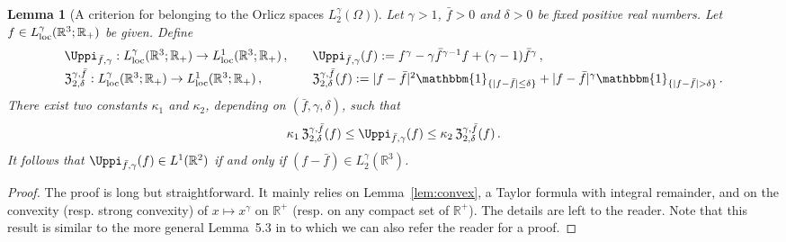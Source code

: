 \documentclass[11pt,reqno]{amsart}
\newtheorem{lemma}{Lemma}
\def \R{{\mathbb{R}}}
\begin{document}
\begin{lemma}[A criterion for  belonging to the Orlicz spaces $L_2^\gamma(\Omega)$]
  \label{lem:ORC}
  Let $\gamma >1$, $\bar f > 0$ and $\delta >0$ be fixed positive real numbers. Let $ f\in L_{\rm loc}^\gamma(\R^3;\R_+)$ be given. Define
  \[\begin{array}{ll}
    \Uppi_{ \bar f, \gamma } :  L_{\rm loc}^\gamma(\R^3;\R_+) \rightarrow L_{\rm loc}^1(\R^3;\R_+) \,, \quad & \Uppi_{\bar f,\gamma}(f) := f^\gamma - \gamma \bar{f}^{\gamma -1}f +(\gamma -1) {\bar f}^{\gamma} \,, \smallskip \\
    \mathfrak Z_{2,\delta}^{\gamma, \bar f}:   L_{\rm loc}^\gamma (\R^3;\R_+) \rightarrow L_{\rm loc}^1(\R^3;\R_+) \,, \quad & \mathfrak Z_{2,\delta}^{\gamma, \bar f}(f) := |f-\bar f|^2\mathbbm{1}_{\{|f-\bar f|\leq \delta \}} + |f-\bar f|^\gamma\mathbbm{1}_{\{|f-\bar f|> \delta \}} \, .
    \end{array} \]
There exist two constants $\kappa_1$ and $\kappa_2$, depending on $(\bar f, \gamma, \delta)$, such that
    \[
    \kappa_1\, \mathfrak Z_{2,\delta}^{\gamma,\bar f}(f) \leq  \Uppi_{\bar f,\gamma}(f) \leq  \kappa_2\, \mathfrak Z_{2,\delta}^{\gamma, \bar f}(f)\,. 
    \]
  It follows that $\Uppi_{\bar f,\gamma}(f) \in L^1(\R^2)$ if and only if $(f-\bar f) \in L_2^\gamma(\R^3)$.
\end{lemma}
\begin{proof}  
The proof is long but straightforward. It mainly relies on Lemma~\ref{lem:convex}, a Taylor formula with integral remainder, and on the convexity (resp. strong convexity) of $ x\mapsto x^\gamma $ on $\R^+$ (resp. on  any compact set  of $\R^+$). The details are left to the reader. Note that
this result is similar to the more general Lemma~5.3 in \cite{Lio98} to which we can also refer the reader for a  proof.
\end{proof}
\end{document}
